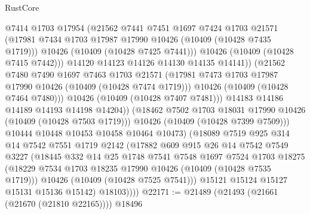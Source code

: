 \begin{lexlean}{RustCore}
\begin{coremodule}
                          @7414
                          @1703
                          @17954
                          (@21562
                            @7441
                            @7451
                            @1697
                            @7424
                            @1703
                            @21571
                            (@17981 @7434 @1703 @17987 @17990 @10426 (@10409 (@10428 @7435 @1719)))
                            @10426
                            (@10409 (@10428 @7425 @7441)))
                          @10426
                          (@10409 (@10428 @7415 @7442)))
                        @14120
                        @14123
                        @14126
                        @14130
                        @14135
                        @14141))
                    (@21562
                      @7480
                      @7490
                      @1697
                      @7463
                      @1703
                      @21571
                      (@17981 @7473 @1703 @17987 @17990 @10426 (@10409 (@10428 @7474 @1719)))
                      @10426
                      (@10409 (@10428 @7464 @7480)))
                    @10426
                    (@10409 (@10428 @7407 @7481)))
                  @14183
                  @14186
                  @14189
                  @14193
                  @14198
                  @14204))
              (@18462 @7502 @1703 @18031 @17990 @10426 (@10409 (@10428 @7503 @1719)))
              @10426
              (@10409 (@10428 @7399 @7509)))
            @10444
            @10448
            @10453
            @10458
            @10464
            @10473)
          (@18089
            @7519
            @925
            @314
            @14
            @7542
            @7551
            @1719
            @2142
            (@17882
              @609
              @915
              @26
              @14
              @7542
              @7549
              @3227
              (@18445
                @332
                @14
                @25
                @1748
                @7541
                @7548
                @1697
                @7524
                @1703
                @18275
                (@18229 @7534 @1703 @18235 @17990 @10426 (@10409 (@10428 @7535 @1719)))
                @10426
                (@10409 (@10428 @7525 @7541)))
              @15121
              @15124
              @15127
              @15131
              @15136
              @15142)
            @18103))))
@22171 := @21489 (@21493 (@21661 (@21670 (@21810 @22165)))) @18496

\end{coremodule}
\end{lexlean}
